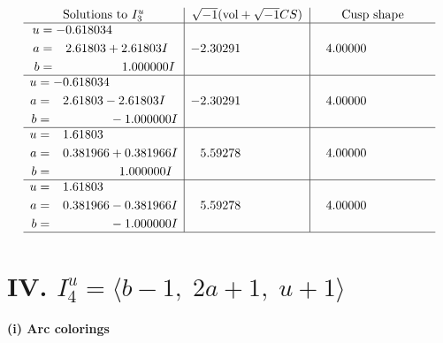 \documentclass[1p]{elsarticle_modified}
\theoremstyle{definition}
\newcommand{\I}{\sqrt{-1}}
\begin{document}
$$\begin{array}{c|c|c}  
\text{Solutions to }I^u_{3}& \I (\text{vol} + \sqrt{-1}CS) & \text{Cusp shape}\\
 \hline 
\begin{aligned}
u &= -0.618034\phantom{ +0.000000I} \\
a &= \phantom{-}2.61803 + 2.61803 I \\
b &= \phantom{-0.000000 -}1.000000 I\end{aligned}
 & -2.30291\phantom{ +0.000000I} & \phantom{-}4.00000\phantom{ +0.000000I} \\ \hline\begin{aligned}
u &= -0.618034\phantom{ +0.000000I} \\
a &= \phantom{-}2.61803 - 2.61803 I \\
b &= \phantom{-0.000000 } -1.000000 I\end{aligned}
 & -2.30291\phantom{ +0.000000I} & \phantom{-}4.00000\phantom{ +0.000000I} \\ \hline\begin{aligned}
u &= \phantom{-}1.61803\phantom{ +0.000000I} \\
a &= \phantom{-}0.381966 + 0.381966 I \\
b &= \phantom{-0.000000 -}1.000000 I\end{aligned}
 & \phantom{-}5.59278\phantom{ +0.000000I} & \phantom{-}4.00000\phantom{ +0.000000I} \\ \hline\begin{aligned}
u &= \phantom{-}1.61803\phantom{ +0.000000I} \\
a &= \phantom{-}0.381966 - 0.381966 I \\
b &= \phantom{-0.000000 } -1.000000 I\end{aligned}
 & \phantom{-}5.59278\phantom{ +0.000000I} & \phantom{-}4.00000\phantom{ +0.000000I}\\
 \hline 
 \end{array}$$\newpage\newpage\renewcommand{\arraystretch}{1}
\centering \section*{IV. $I^u_{4}= \langle b-1,\;2 a+1,\;u+1 \rangle$}
\flushleft \textbf{(i) Arc colorings}\\
\end{document}

